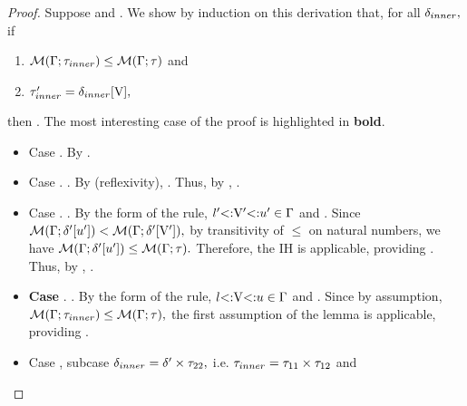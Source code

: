 \begin{proof}
    Suppose 
    and .
    We show by induction on this derivation that, for all $\delta_{inner},$ if
    \begin{enumerate}
        \item $\operatorname{\mathcal{M}}(\Gamma;\tau_{inner}) \leq \operatorname{\mathcal{M}}(\Gamma;\tau)$ and
        \item $\tau'_{inner} = \delta_{inner}[\mathrm{V}],$
    \end{enumerate}
    then .
    The most interesting case of the proof is highlighted in \textbf{bold}.
    \begin{itemize}
        \item Case . By .
        \item Case . \subtydflt{\vany}{\vany}.
            By  (reflexivity),
            \subtydflt{\tyub}{\tyub}.
            Thus, by , \subtydflt{\vany}{\tyub}.
        \item Case . 
            .
            By the form of the rule, $l'{\operatorname{<:}}\mathrm{V}'{\operatorname{<:}}u' \in \Gamma$
            and .
            Since $\operatorname{\mathcal{M}}(\Gamma;\delta'[u']) < 
            \operatorname{\mathcal{M}}(\Gamma;\delta'[\mathrm{V}']),$ by transitivity of $\leq$ on
            natural numbers, we have $\operatorname{\mathcal{M}}(\Gamma;\delta'[u'])
            \leq \operatorname{\mathcal{M}}(\Gamma;\tau).$
            Therefore, the IH is applicable, providing 
            .
            Thus, by ,
            .
        \item \textbf{Case }. .
            By the form of the rule, $l{\operatorname{<:}}\mathrm{V}{\operatorname{<:}}u \in \Gamma$
            and .
            Since by assumption, 
            $\operatorname{\mathcal{M}}(\Gamma;\tau_{inner}) \leq \operatorname{\mathcal{M}}(\Gamma;\tau),$
            the first assumption of the lemma is applicable, 
            providing .
        \item Case , subcase
            $\delta_{inner} = \delta' \times \tau_{22},$ i.e.
            $\tau_{inner} = \tau_{11} \times \tau_{12}$ and
            \subtydflt
                {}

\end{itemize}
\end{proof}
